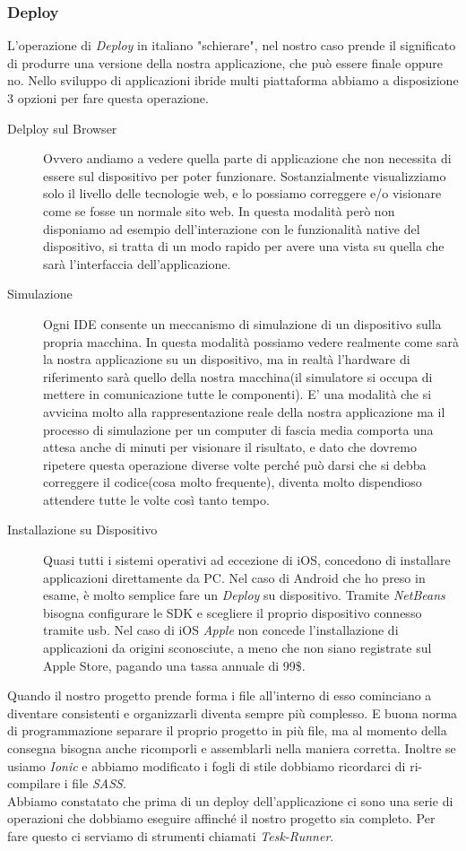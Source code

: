 \subsubsection{Deploy}
L'operazione di \emph{Deploy} in italiano "schierare", nel nostro caso prende il significato di produrre una versione della nostra applicazione, che può essere finale oppure no. Nello sviluppo di applicazioni ibride multi piattaforma abbiamo a disposizione 3 opzioni per fare questa operazione.
\begin{description}
\item[Delploy sul Browser] Ovvero andiamo a vedere quella parte di applicazione che non necessita di essere sul dispositivo per poter funzionare. Sostanzialmente visualizziamo solo il livello delle tecnologie web, e lo possiamo correggere e/o visionare come se fosse un normale sito web. In questa modalità però non disponiamo ad esempio dell'interazione con le funzionalità native del dispositivo, si tratta di un modo rapido per avere una vista su quella che sarà l'interfaccia dell'applicazione.
\item[Simulazione] Ogni IDE consente un meccanismo di simulazione di un dispositivo sulla propria macchina. In questa modalità possiamo vedere realmente come sarà la nostra applicazione su un dispositivo, ma in realtà l'hardware di riferimento sarà quello della nostra macchina(il simulatore si occupa di mettere in comunicazione tutte le componenti). E' una modalità che si avvicina molto alla rappresentazione reale della nostra applicazione ma il processo di simulazione per un computer di fascia media comporta una attesa anche di minuti per visionare il risultato, e dato che dovremo ripetere questa operazione diverse volte perché può darsi che si debba correggere il codice(cosa molto frequente), diventa molto dispendioso attendere tutte le volte così tanto tempo.
\item[Installazione su Dispositivo] Quasi tutti i sistemi operativi ad eccezione di iOS, concedono di installare applicazioni direttamente da PC. Nel caso di Android che ho preso in esame, è molto semplice fare un \emph{Deploy} su dispositivo. Tramite \emph{NetBeans} bisogna configurare le SDK e scegliere il proprio dispositivo connesso tramite usb. Nel caso di iOS \emph{Apple} non concede l'installazione di applicazioni da origini sconosciute, a meno che non siano registrate sul Apple Store, pagando una tassa annuale di 99\$.
\end{description}
Quando il nostro progetto prende forma i file all'interno di esso cominciano a diventare consistenti e organizzarli diventa sempre più complesso. E buona norma di programmazione separare il proprio progetto in più file, ma al momento della consegna bisogna anche ricomporli e assemblarli nella maniera corretta. Inoltre se usiamo \emph{Ionic} e abbiamo modificato i fogli di stile dobbiamo ricordarci di ri-compilare i file \emph{SASS}.\\
Abbiamo constatato che prima di un deploy dell'applicazione ci sono una serie di operazioni che dobbiamo eseguire affinché il nostro progetto sia completo. Per fare questo ci serviamo di strumenti chiamati \emph{Tesk-Runner}.
